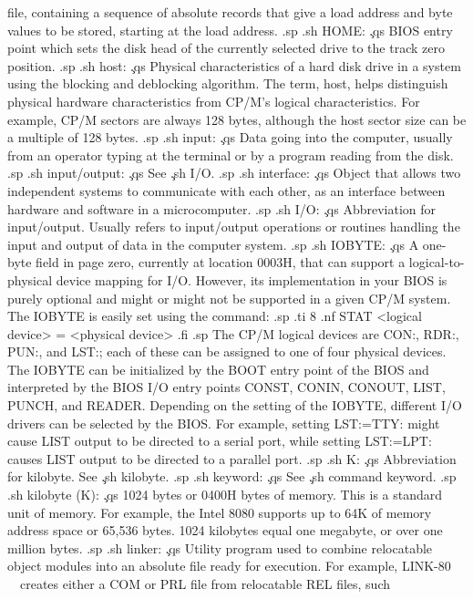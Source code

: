 file, containing a sequence of absolute records that give a load 
address and byte values to be stored, starting at the load 
address.
.sp
.sh
HOME:  \c
.qs
BIOS entry point which sets the disk head of the currently 
selected drive to the track zero position.
.sp
.sh
host:  \c
.qs
Physical characteristics of a hard disk drive in a system using 
the blocking and deblocking algorithm.  The term, host, helps 
distinguish physical hardware characteristics from CP/M's logical 
characteristics.  For example, CP/M sectors are always 128 bytes, 
although the host sector size can be a multiple of 128 bytes.
.sp
.sh
input:  \c
.qs
Data going into the computer, usually from an operator typing at 
the terminal or by a program reading from the disk.
.sp
.sh
input/output:  \c
.qs
See \c
.sh
I/O.
.sp
.sh
interface:  \c
.qs
Object that allows two independent systems to communicate with 
each other, as an interface between hardware and software in a 
microcomputer.
.sp
.sh
I/O:  \c
.qs
Abbreviation for input/output.  Usually refers to input/output 
operations or routines handling the input and output of data in 
the computer system.
.sp
.sh
IOBYTE:  \c
.qs
A one-byte field in page zero, currently at location 0003H, that 
can support a logical-to-physical device mapping for I/O.  
However, its implementation in your BIOS is purely optional and 
might or might not be supported in a given CP/M system.  The IOBYTE 
is easily set using the command:
.sp
.ti 8
.nf
STAT <logical device> = <physical device>
.fi
.sp
The CP/M logical devices are CON:, RDR:, PUN:, and LST:; each of 
these can be assigned to one of four physical devices.  The IOBYTE 
can be initialized by the BOOT entry point of the BIOS and 
interpreted by the BIOS I/O entry points CONST, CONIN, CONOUT, 
LIST, PUNCH, and READER.  Depending on the setting of the IOBYTE, 
different I/O drivers can be selected by the BIOS.  For example, 
setting LST:=TTY: might cause LIST output to be directed to a 
serial port, while setting LST:=LPT: causes LIST output to be 
directed to a parallel port.
.sp
.sh
K:  \c
.qs
Abbreviation for kilobyte.  See \c
.sh
kilobyte.
.sp
.sh
keyword:  \c
.qs
See \c
.sh
command keyword.
.sp
.sh
kilobyte (K):  \c
.qs
1024 bytes or 0400H bytes of memory.  This is a standard unit of 
memory.  For example, the Intel 8080 supports up to 64K of memory 
address space or 65,536 bytes.  1024 kilobytes equal one megabyte, 
or over one million bytes.
.sp
.sh
linker:  \c
.qs
Utility program used to combine relocatable object modules into 
an absolute file ready for execution.  For example, LINK-80 \ \ 
creates either a COM or PRL file from relocatable REL files, such 

